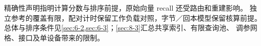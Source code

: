 精确性声明指明计算分数与排序前提，原始向量 recall 还受路由和重建影响。
独立参考的覆盖有限，配对计时保留工作负载对照，字节／回本模型保留核算前提。
总体与排序条件见\cref{sec:6-2,sec:6-3}；\cref{sec:8-3}汇总共享索引、有限查询池、
调参网格、接口及单设备带来的限制。

